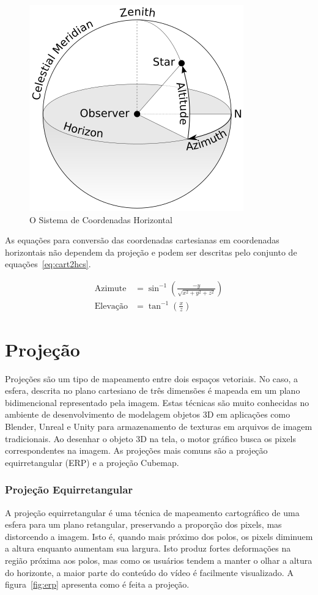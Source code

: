 {\begin{figure}[h]
	\centering
	\includegraphics[width=0.30\linewidth]{fig/hcs.png}
	\caption{O Sistema de Coordenadas Horizontal}
	\label{fig:hcs}	 
\end{figure}

As equações para conversão das coordenadas cartesianas em coordenadas horizontais não dependem da projeção e podem ser descritas pelo conjunto de equações~\ref{eq:cart2hcs}.

\begin{equation}
\label{eq:cart2hcs}
\begin{split}
	\text{Azimute} &=\sin^{-1}\left(\frac{-y}{\sqrt{x^2+y^2+z^2}}\right) \\
	\text{Elevação} &=\tan^{-1}\left(\frac{x}{z}\right)
\end{split}		
\end{equation}	


\section{Projeção}

Projeções são um tipo de mapeamento entre dois espaços vetoriais. No caso, a esfera, descrita no plano cartesiano de três dimensões é mapeada em um plano bidimencional representado pela imagem. Estas técnicas são muito conhecidas no ambiente de desenvolvimento de modelagem objetos 3D em aplicações como Blender, Unreal e Unity para armazenamento de texturas em arquivos de imagem tradicionais. Ao desenhar o objeto 3D na tela, o motor gráfico busca os pixels correspondentes na imagem. As projeções mais comuns são a projeção equirretangular (ERP) e a projeção Cubemap. 

\subsubsection{Projeção Equirretangular}

A projeção equirretangular é uma técnica de mapeamento cartográfico de uma esfera para um plano retangular, preservando a proporção dos pixels, mas distorcendo a imagem. Isto é, quando mais próximo dos polos, os pixels diminuem a altura enquanto aumentam sua largura. Isto produz fortes deformações na região próxima aos polos, mas como os usuários tendem a manter o olhar a altura do horizonte, a maior parte do conteúdo do vídeo é facilmente visualizado. A figura~\ref{fig:erp} apresenta como é feita a projeção.

}
